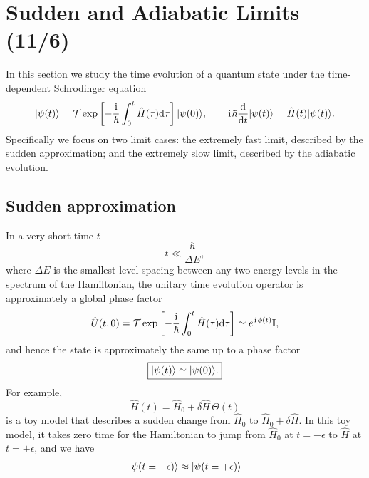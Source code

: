 \section{Sudden and Adiabatic Limits (11/6)}


In this section we study the time evolution of a quantum state under the time-dependent Schrodinger equation 
\begin{equation}
|{\psi(t)}\rangle=
\mathcal T\exp\left[-\frac{\hspace{1pt}\mathrm{i}\hspace{1pt}}{\hbar}
\int_0^t\hat H(\tau)\mathrm{d}\tau\right]|{\psi(0)}\rangle,
\qquad
\hspace{1pt}\mathrm{i}\hspace{1pt}\hbar\frac{\mathrm{d}}{\mathrm{d} t}|{\psi(t)}\rangle
=\hat H(t)|{\psi(t)}\rangle.
\end{equation}
Specifically we focus on two limit cases: the extremely fast limit, described by the sudden approximation; and the extremely slow limit, described by the adiabatic evolution. 

\subsection{Sudden approximation}
In a very short time $t$
\begin{equation}
 t\ll\frac{\hbar}{\Delta E},
\end{equation}
where $\Delta E$ is the smallest level spacing between any two energy levels in the spectrum of the Hamiltonian, the unitary time evolution operator is approximately a global phase factor 
\begin{equation}
\hat U(t,0)=\mathcal T
\exp\left[-\frac{\hspace{1pt}\mathrm{i}\hspace{1pt}}{\hbar}\int_0^t\hat H(\tau)\mathrm{d}\tau\right]
\simeq e^{\hspace{1pt}\mathrm{i}\hspace{1pt}\phi(t)}\mathbb{I},
\end{equation}
and hence the state is approximately the same up to a phase factor
\begin{equation}
\boxed{|{\psi(t)}\rangle\simeq|{\psi(0)}\rangle.}
\end{equation}
For example,
\begin{equation}
\hat H(t)=\hat H_0+\delta\hat H\,\Theta(t)
\end{equation}
is a toy model that describes a sudden change from $\hat H_0$ to $\hat H_0+\delta\hat H$. In this toy model, it takes zero time for the Hamiltonian to jump from $\hat H_0$ at $t=-\epsilon$ to $\hat H$ at $t=+\epsilon$, and we have
\begin{align}
    |{\psi(t=-\epsilon)}\rangle\approx|{\psi(t=+\epsilon)}\rangle
\end{align}

